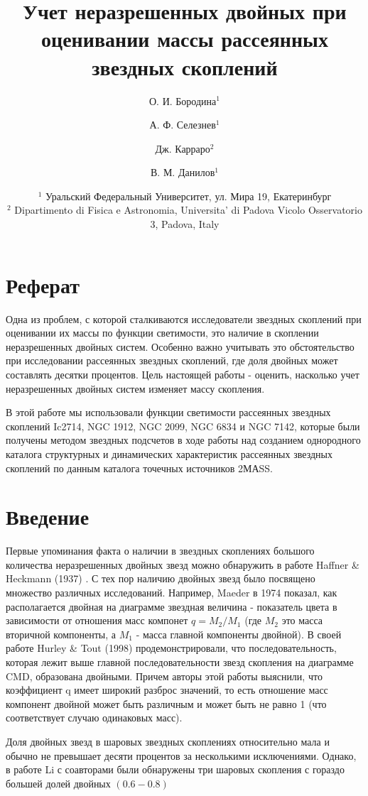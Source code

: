 \documentclass[a4paper,12pt]{article}
\title{Учет неразрешенных двойных при оценивании массы рассеянных звездных скоплений}
\author{О. И. Бородина$^1$ \and А. Ф. Селезнев$^1$ \and Дж. Карраро$^2$ \and В. М. Данилов$^1$ }
\date{\footnotesize{
    $^1$ Уральский Федеральный Университет, ул. Мира 19, Екатеринбург\\%
    $^2$ Dipartimento di Fisica e Astronomia, Universita’ di Padova Vicolo Osservatorio 3, Padova, Italy}\\%
    }
\begin{document}
\maketitle
\section*{Реферат}
Одна из проблем, с которой сталкиваются исследователи звездных скоплений при оценивании их массы по функции светимости, это наличие в скоплении неразрешенных двойных систем. Особенно важно учитывать это обстоятельство при исследовании рассеянных звездных скоплений, где доля двойных может составлять десятки процентов. Цель настоящей работы - оценить, насколько учет неразрешенных двойных систем изменяет массу скопления.
 
В этой работе мы использовали функции светимости рассеянных звездных скоплений Ic2714, NGC 1912, NGC 2099, NGC 6834 и NGC 7142, которые были получены методом звездных подсчетов в ходе работы над созданием однородного каталога структурных и динамических характеристик рассеянных звездных скоплений по данным каталога точечных источников 2МАSS.

\section*{Введение}
Первые упоминания факта о наличии в звездных скоплениях большого количества неразрешенных двойных звезд можно обнаружить в работе Haffner \& Heckmann (1937) \cite{HH}.
С тех пор наличию двойных звезд было посвящено множество различных исследований. Например, Maeder в 1974 \cite{Maeder} показал, как располагается двойная на диаграмме звездная величина - показатель цвета в зависимости от отношения масс компонет $q=M_2/M_1$ (где $M_2$ это масса вторичной компоненты, а $M_1$ - масса главной компоненты двойной). В своей работе Hurley \& Tout (1998) \cite{HT} продемонстрировали, что последовательность, которая лежит выше главной последовательности звезд скопления на диаграмме CMD, образована двойными. Причем авторы этой работы выяснили, что коэффициент q имеет широкий разброс значений, то есть отношение масс компонент двойной может быть различным и может быть не равно 1 (что соответствует случаю одинаковых масс). 

Доля двойных звезд в шаровых звездных скоплениях относительно мала и обычно не превышает десяти процентов \cite{Milone2012} за несколькими исключениями. Однако, в работе Li с соавторами \cite{Li17} были обнаружены три шаровых скопления с гораздо большей долей двойных $(0.6-0.8)$
\end{document}
